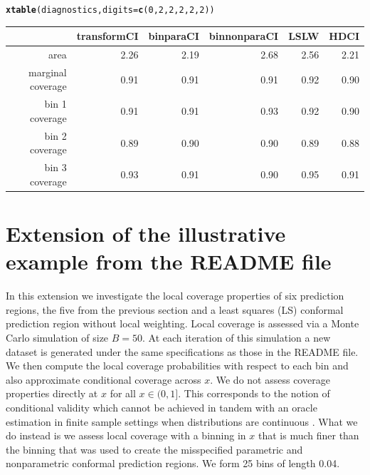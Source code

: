 \documentclass[11pt]{article}\usepackage[]{graphicx}\usepackage[]{color}
\makeatletter
\newcommand{\hlnum}[1]{\textcolor[rgb]{0.686,0.059,0.569}{#1}}%
\newcommand{\hlstd}[1]{\textcolor[rgb]{0.345,0.345,0.345}{#1}}%
\newcommand{\hlkwc}[1]{\textcolor[rgb]{0.333,0.667,0.333}{#1}}%
\newcommand{\hlkwd}[1]{\textcolor[rgb]{0.737,0.353,0.396}{\textbf{#1}}}%
\newenvironment{kframe}{%
 \def\at@end@of@kframe{}%
 \ifinner\ifhmode%
  \def\at@end@of@kframe{\end{minipage}}%
  \begin{minipage}{\columnwidth}%
 \fi\fi%
 \def\FrameCommand##1{\hskip\@totalleftmargin \hskip-\fboxsep
 \colorbox{shadecolor}{##1}\hskip-\fboxsep
     \hskip-\linewidth \hskip-\@totalleftmargin \hskip\columnwidth}%
 \MakeFramed {\advance\hsize-\width
   \@totalleftmargin\z@ \linewidth\hsize
   \@setminipage}}%
 {\par\unskip\endMakeFramed%
 \at@end@of@kframe}
\makeatother
\begin{document}
\begin{kframe}
\begin{alltt}
\hlkwd{xtable}\hlstd{(diagnostics,} \hlkwc{digits} \hlstd{=} \hlkwd{c}\hlstd{(}\hlnum{0}\hlstd{,} \hlnum{2}\hlstd{,} \hlnum{2}\hlstd{,} \hlnum{2}\hlstd{,} \hlnum{2}\hlstd{,} \hlnum{2}\hlstd{))}
\end{alltt}
\end{kframe}%
\begin{table}[ht]
\centering
\begin{tabular}{rrrrrr}
  \hline
 & transformCI & binparaCI & binnonparaCI & LSLW & HDCI \\ 
  \hline
area & 2.26 & 2.19 & 2.68 & 2.56 & 2.21 \\ 
  marginal coverage & 0.91 & 0.91 & 0.91 & 0.92 & 0.90 \\ 
  bin 1 coverage & 0.91 & 0.91 & 0.93 & 0.92 & 0.90 \\ 
  bin 2 coverage & 0.89 & 0.90 & 0.90 & 0.89 & 0.88 \\ 
  bin 3 coverage & 0.93 & 0.91 & 0.90 & 0.95 & 0.91 \\ 
   \hline
\end{tabular}
\end{table}



\section{Extension of the illustrative example from the README file}

In this extension we investigate the local coverage properties of six  
prediction regions, the five from the previous section and a least squares 
(LS) conformal prediction region without local weighting.  Local coverage is 
assessed via a Monte Carlo simulation of size $B = 50$.  At each iteration 
of this simulation a new dataset is generated under the same specifications 
as those in the README file.  We then compute the local coverage probabilities 
with respect to each bin and also approximate conditional coverage across $x$.  
We do not assess coverage properties directly at $x$ for all $x \in (0,1]$.  
This corresponds to the notion of conditional validity which cannot be 
achieved in tandem with an oracle estimation in finite sample settings when 
distributions are continuous \citep[Section 2.2]{lei2014distribution}.  
What we do instead is we assess local coverage with a binning in $x$ that is 
much finer than the binning that was used to create the misspecified 
parametric and nonparametric conformal prediction regions.  We form 25 bins 
of length 0.04. 
\end{document}
